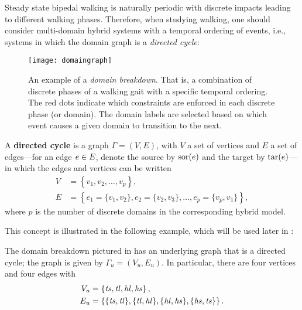 Steady state bipedal walking is naturally periodic with discrete impacts leading
to different walking phases.
%
Therefore, when studying walking, one should consider multi-domain hybrid
systems with a temporal ordering of events, i.e., systems in which the domain
graph is a {\em directed cycle}:

\begin{figure}[t]
  \centering
  \texttt{[image: domaingraph]}
  \caption[An example of a {\em domain breakdown}.]{An example of a {\em domain
      breakdown}.
    That is, a combination of discrete phases of a walking gait with a specific
    temporal ordering. The red dots indicate which constraints are enforced in
    each discrete phase (or domain).
    The domain labels are selected based on which event causes a given domain to
    transition to the next.}
  \label{fig:domaingraph}
\end{figure}

\begin{definition}
  A {\bf directed cycle} is a graph $\Gamma = (V, E)$, with $V$ a set of
  vertices and $E$ a set of edges---for an edge $e \in E$, denote the source by
  $\mathrm{sor}(e)$ and the target by $\mathrm{tar}(e)$---in which the edges and vertices can be
  written
  \begin{align}
    \nonumber
    V &= \left\{v_{1}, v_{2}, \ldots, v_{p}\right\},\\
    \label{eq:directedcyclep}
    E &= \left\{e_{1} = \{v_{1}, v_{2}\}, e_{2} = \{v_{2}, v_{3}\}, \ldots,
      e_{p} = \{v_{p}, v_{1}\}\right\},
  \end{align}
  where $p$ is the number of discrete domains in the corresponding hybrid
  model.
\end{definition}

This concept is illustrated in the following example, which will be used later
in :

\begin{exmp} \label{universalgraph}
  The domain breakdown pictured in  has an underlying
  graph that is a directed cycle;
  the graph is given by $\Gamma_{u} = (V_{u}, E_{u})$.
  In particular, there are four vertices and four edges with
  \begin{align*}
    V_u &= \left\{\mathit{ts}, \mathit{tl}, \mathit{hl}, \mathit{hs}\right\},\\
    E_u &= \left\{\{\mathit{ts}, \mathit{tl}\}, \{\mathit{tl}, \mathit{hl}\}, \{\mathit{hl}, \mathit{hs}\}, \{\mathit{hs},
      \mathit{ts}\}\right\}.
  \end{align*}
\end{exmp}

